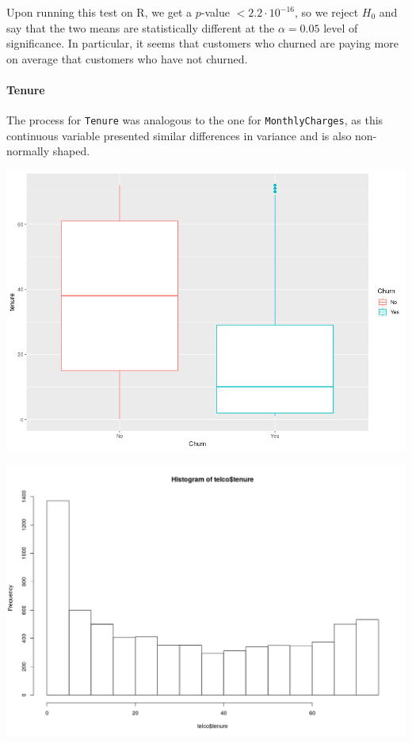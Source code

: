 \documentclass[man, floatsintext]{apa6}
\begin{document}
\hspace{0.5mm}

Upon running this test on R, we get a $p$-value $< 2.2 \cdot 10^{-16}$, so we reject $H_0$ and say that the two means are statistically different at the $\alpha = 0.05$ level of significance. In particular, it seems that customers who churned are paying more on average that customers who have not churned.

\hspace{0.5mm}

\paragraph{Tenure}

The process for \texttt{Tenure} was analogous to the one for \texttt{MonthlyCharges}, as this continuous variable presented similar differences in variance and is also non-normally shaped. 

\hspace{0.5mm}

\noindent\begin{minipage}{0.485\textwidth}
\includegraphics[width = \linewidth]{boxplot_tenurebyChurn}
\end{minipage}
\hfill
\begin{minipage}{0.5\textwidth} 
\includegraphics[width = \linewidth]{histogram_Tenure}
\end{minipage}
\end{document}
